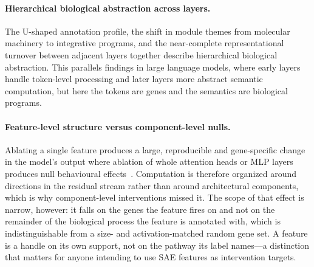 \paragraph{Hierarchical biological abstraction across layers.}
The U-shaped annotation profile, the shift in module themes from molecular machinery to integrative
programs, and the near-complete representational turnover between adjacent layers together describe
hierarchical biological abstraction. This parallels findings in large language models, where early
layers handle token-level processing and later layers more abstract semantic computation, but here
the tokens are genes and the semantics are biological programs.

\paragraph{Feature-level structure versus component-level nulls.}
Ablating a single feature produces a large, reproducible and gene-specific change in the model's
output where ablation of whole attention heads or MLP layers produces null behavioural
effects~\cite{kendiukhov2025systematic}. Computation is therefore organized around directions in
the residual stream rather than around architectural components, which is why component-level
interventions missed it. The scope of that effect is narrow, however: it falls on the genes the
feature fires on and not on the remainder of the biological process the feature is annotated with,
which is indistinguishable from a size- and activation-matched random gene set. A feature is a
handle on its own support, not on the pathway its label names---a distinction that matters for
anyone intending to use SAE features as intervention targets.

